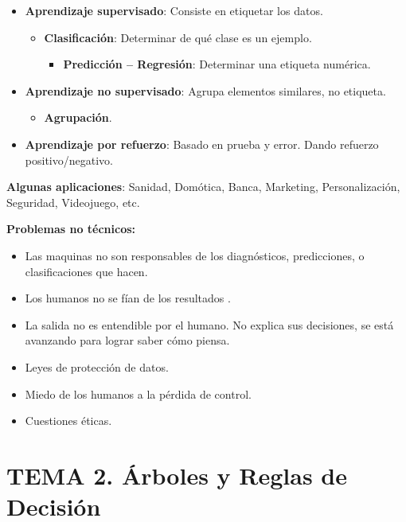 \documentclass[12pt]{report} %
\begin{document}
\begin{itemize}

\item
  \textbf{Aprendizaje supervisado}: Consiste en etiquetar los datos.

  \begin{itemize}
  
  \item
    \textbf{Clasificación}: Determinar de qué clase es un ejemplo.

    \begin{itemize}
    
    \item
      \textbf{Predicción -- Regresión}: Determinar una etiqueta
      numérica.
    \end{itemize}
  \end{itemize}
\item
  \textbf{Aprendizaje no supervisado}: Agrupa elementos similares, no
  etiqueta.

  \begin{itemize}
  
  \item
    \textbf{Agrupación}.
  \end{itemize}
\item
  \textbf{Aprendizaje por refuerzo}: Basado en prueba y error. Dando
  refuerzo positivo/negativo.
\end{itemize}

\textbf{Algunas aplicaciones}: Sanidad, Domótica, Banca, Marketing,
Personalización, Seguridad, Videojuego, etc.

\textbf{Problemas no técnicos:}

\begin{itemize}
\item
  Las maquinas no son responsables de los diagnósticos, predicciones, o
  clasificaciones que hacen.
\item
  Los humanos no se fían de los resultados .
\item
  La salida no es entendible por el humano. No explica sus decisiones,
  se está avanzando para lograr saber cómo piensa.
\item
  Leyes de protección de datos.
\item
  Miedo de los humanos a la pérdida de control.
\item
  Cuestiones éticas.
\end{itemize}

\chapter{TEMA 2. Árboles y Reglas de
Decisión}
\end{document}
